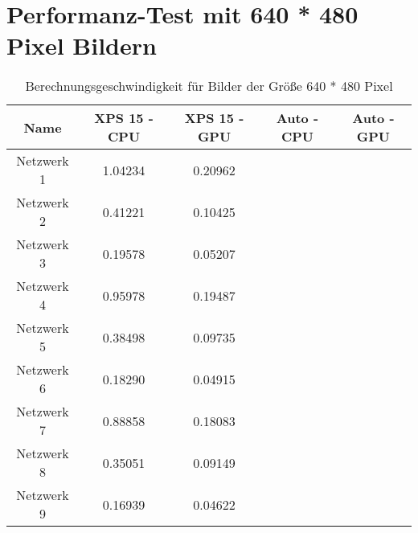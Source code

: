\section{Performanz-Test mit 640 * 480 Pixel Bildern}
\begin{table}[H]
    \centering
    \begin{tabular}{ |c|c|c|c|c| }
        \hline
        \textbf{Name} & \textbf{XPS 15 - CPU} & \textbf{XPS 15 - GPU} & \textbf{Auto - CPU} & \textbf{Auto - GPU}   \\ \hline
        Netzwerk 1 & 1.04234 & 0.20962 & & \\ \hline
        Netzwerk 2 & 0.41221 & 0.10425 & & \\ \hline
        Netzwerk 3 & 0.19578 & 0.05207 & & \\ \hline
	
        Netzwerk 4 & 0.95978 & 0.19487 & & \\ \hline
        Netzwerk 5 & 0.38498 & 0.09735 & & \\ \hline
        Netzwerk 6 & 0.18290 & 0.04915 & & \\ \hline

        Netzwerk 7 & 0.88858 & 0.18083 & & \\ \hline
        Netzwerk 8 & 0.35051 & 0.09149 & & \\ \hline
        Netzwerk 9 & 0.16939 & 0.04622 & & \\ \hline
    \end{tabular}
    \caption{Berechnungsgeschwindigkeit für Bilder der Größe 640 * 480 Pixel}
    \label{tab:640x480}
\end{table}

